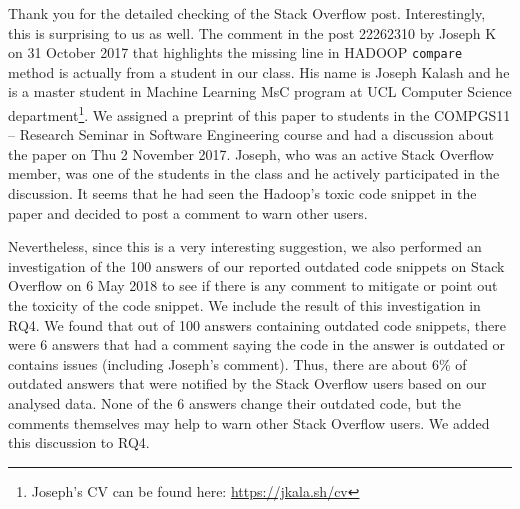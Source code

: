 \documentclass[a4paper,twoside,10pt]{reviewresponse}
\begin{document}

Thank you for the detailed checking of the Stack Overflow post. Interestingly,
this is surprising to us as well. The comment in the post 22262310 by Joseph K
on 31 October 2017 that highlights the missing line in HADOOP \texttt{compare}
method is actually from a student in our class. His name is Joseph Kalash and he
is a master student in Machine Learning MsC program at UCL Computer Science
department\footnote{Joseph's CV can be found here: \url{https://jkala.sh/cv}}.
We assigned a preprint of this paper to students in the COMPGS11 -- Research
Seminar in Software Engineering course and had a discussion about the paper on
Thu 2 November 2017. Joseph, who was an active Stack Overflow member, was one of
the students in the class and he actively participated in the discussion. It
seems that he had seen the Hadoop's toxic code snippet in the paper and decided
to post a comment to warn other users.

Nevertheless, since this is a very interesting suggestion, we also performed an
investigation of the 100 answers of our reported outdated code snippets on Stack
Overflow on 6 May 2018 to see if there is any comment to mitigate or point out
the toxicity of the code snippet. We include the result of this investigation in
RQ4. We found that out of 100 answers containing outdated code snippets,
there were 6 answers that had a comment saying the code in the answer is
outdated or contains issues (including Joseph's comment). Thus, there are about
6\% of outdated answers that were notified by the Stack Overflow users based on
our analysed data. None of the 6 answers change their outdated code, but the
comments themselves may help to warn other Stack Overflow users. We added this
discussion to RQ4.

\end{document}
